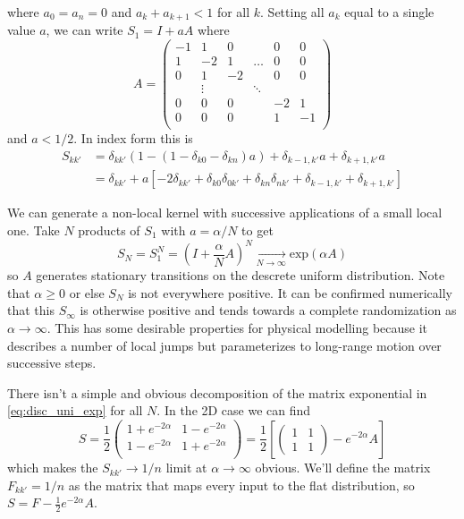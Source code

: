 \documentclass{article}
\begin{document}
where $a_0 = a_n = 0$ and $a_k + a_{k+1} < 1$ for all $k$. Setting all $a_k$ equal to a single value $a$, we can write $S_1 = I + a A$ where
\begin{equation}
  A = \begin{pmatrix}
    -1 & 1 & 0 &  & 0 & 0\\
    1 & -2 & 1 & \hdots & 0 & 0\\
    0 & 1 & -2 & & 0 & 0 \\
      & \vdots & & \ddots \\
     0 & 0 & 0 & & -2 & 1 \\
     0 & 0 & 0 & & 1 & -1 \\
  \end{pmatrix}
  \label{eq:disc_uni_gen}
\end{equation}
and $a < 1/2$. In index form this is
\begin{align}
  S_{kk'} &= \delta_{kk'}\left(1 - (1 - \delta_{k0} -\delta_{kn})a\right) + \delta_{k-1,k'}a + \delta_{k+1,k'}a \\
   &= \delta_{kk'} + a \left[-2\delta_{kk'} + \delta_{k0}\delta_{0k'} + \delta_{kn}\delta_{nk'}  + \delta_{k-1,k'} + \delta_{k+1,k'}\right]
  \label{eq:discrete_uni_trans_idx_simp}
\end{align}

We can generate a non-local kernel with successive applications of a small
local one. Take $N$ products of $S_1$ with $a = \alpha/N$ to get
\begin{equation}
  S_N = S_1^N = \left(I + \frac{\alpha}{N} A \right)^N \underset{N\rightarrow\infty}{\to} \textrm{exp}\left(\alpha A\right)
  \label{eq:disc_uni_exp}
\end{equation}
so $A$ generates stationary transitions on the descrete uniform distribution.
Note that $\alpha \geq 0$ or else $S_N$ is not everywhere positive. It can be
confirmed numerically that this $S_\infty$ is otherwise positive and tends
towards a complete randomization as $\alpha \to \infty$. This has some
desirable properties for physical modelling because it describes a number of
local jumps but parameterizes to long-range motion over successive steps.

There isn't a simple and obvious decomposition of the matrix exponential in
\ref{eq:disc_uni_exp} for all $N$. In the 2D case we can find
\begin{equation}
  S = \frac{1}{2} \begin{pmatrix}
    1 + e^{-2\alpha} & 1 - e^{-2\alpha} \\
    1 - e^{-2\alpha} & 1 + e^{-2\alpha} \\
    \end{pmatrix} = \frac{1}{2} \left[ \begin{pmatrix} 1&1\\1&1 \end{pmatrix} - e^{-2\alpha} A\right]
\end{equation}
which makes the $S_{kk'} \to 1/n$ limit at $\alpha \to \infty$ obvious. We'll
define the matrix $F_{kk'} = 1/n$ as the matrix that maps every input to the
flat distribution, so $S = F - \frac{1}{2}e^{-2\alpha} A$.
\end{document}
